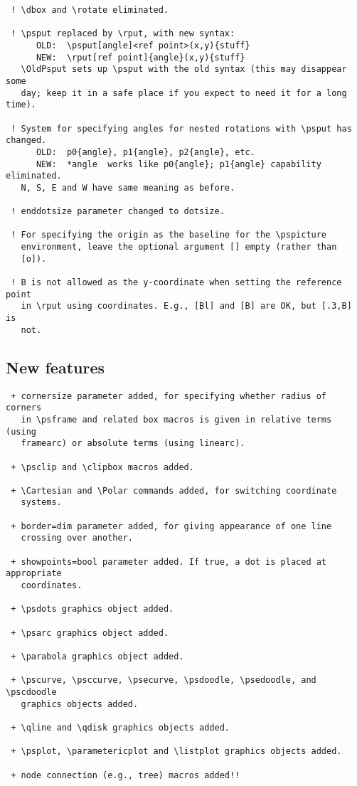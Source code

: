 \begin{Verbatim}
 ! \dbox and \rotate eliminated.

 ! \psput replaced by \rput, with new syntax:
      OLD:  \psput[angle]<ref point>(x,y){stuff}
      NEW:  \rput[ref point]{angle}(x,y){stuff}
   \OldPsput sets up \psput with the old syntax (this may disappear some
   day; keep it in a safe place if you expect to need it for a long time).

 ! System for specifying angles for nested rotations with \psput has changed.
      OLD:  p0{angle}, p1{angle}, p2{angle}, etc.
      NEW:  *angle  works like p0{angle}; p1{angle} capability eliminated.
   N, S, E and W have same meaning as before.

 ! enddotsize parameter changed to dotsize.

 ! For specifying the origin as the baseline for the \pspicture
   environment, leave the optional argument [] empty (rather than
   [o]).

 ! B is not allowed as the y-coordinate when setting the reference point
   in \rput using coordinates. E.g., [Bl] and [B] are OK, but [.3,B] is
   not.

\end{Verbatim}

\subsection{New features}

\begin{Verbatim}
 + cornersize parameter added, for specifying whether radius of corners
   in \psframe and related box macros is given in relative terms (using
   framearc) or absolute terms (using linearc).

 + \psclip and \clipbox macros added.

 + \Cartesian and \Polar commands added, for switching coordinate
   systems.

 + border=dim parameter added, for giving appearance of one line
   crossing over another.

 + showpoints=bool parameter added. If true, a dot is placed at appropriate
   coordinates.

 + \psdots graphics object added.

 + \psarc graphics object added.

 + \parabola graphics object added.

 + \pscurve, \psccurve, \psecurve, \psdoodle, \psedoodle, and \pscdoodle
   graphics objects added.

 + \qline and \qdisk graphics objects added.

 + \psplot, \parametericplot and \listplot graphics objects added.

 + node connection (e.g., tree) macros added!!
\end{Verbatim}

